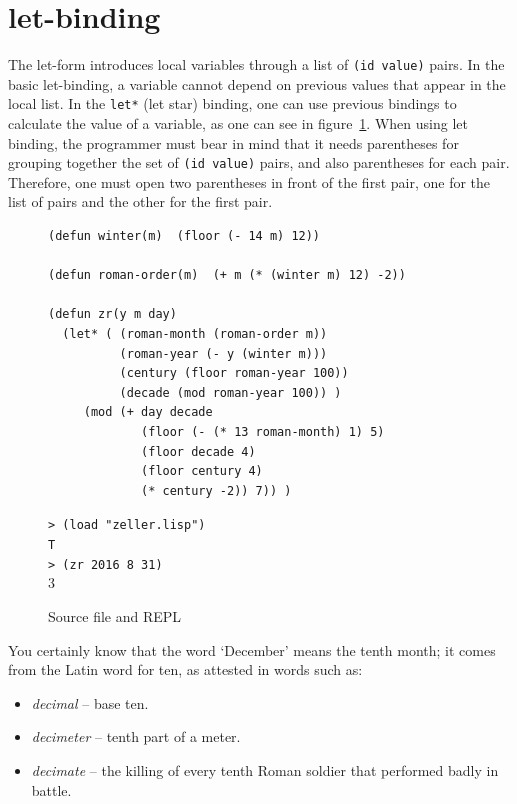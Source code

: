 \documentclass[a4paper,12pt]{book}
\newenvironment{fmpage}[1]
           {\begin{lrbox}{\fmbox}\begin{minipage}{#1}}
           {\end{minipage}\end{lrbox}\fbox{\usebox{\fmbox}}}
\begin{document}
\section{let-binding}
The let-form introduces 
local variables
through a list of \verb|(id value)| 
pairs.
In the basic let-binding, a variable cannot 
depend on previous values that appear
in the local list. In the
\verb|let*| (let star) binding,
one can use previous bindings to calculate
the value of a variable, as one can see in
figure~\ref{fig:date-calculation}.
When using let binding, the programmer must
bear in mind that it needs parentheses for
grouping together the set of \verb|(id value)| pairs,
and also parentheses for each pair. Therefore,
one must open two parentheses in front of the
first pair, one for the list of pairs and the
other for the first pair.


\begin{figure}[!b]
\begin{fmpage}{0.9\linewidth}
\begin{verbatim}
(defun winter(m)  (floor (- 14 m) 12))

(defun roman-order(m)  (+ m (* (winter m) 12) -2))

(defun zr(y m day)
  (let* ( (roman-month (roman-order m))
          (roman-year (- y (winter m)))
          (century (floor roman-year 100))
          (decade (mod roman-year 100)) )
     (mod (+ day decade
             (floor (- (* 13 roman-month) 1) 5)
             (floor decade 4)
             (floor century 4)
             (* century -2)) 7)) )
\end{verbatim}
\end{fmpage}

\begin{fmpage}{0.9\linewidth}
\verb|> (load "zeller.lisp")|\\
\verb|T|\\
\verb|> (zr 2016 8 31)|\\
3
\end{fmpage}
\caption{Source file and REPL}
\label{fig:date-calculation}
\end{figure}

You certainly know that the word `December' means
the tenth month; it comes from the Latin word for
ten, as attested in words such as:
\begin{itemize}
\item {\em decimal} -- base ten.
\item {\em decimeter} -- tenth part of a meter.
\item {\em decimate} -- the killing of every tenth
Roman soldier that performed badly in battle.
\end{itemize}
\end{document}

